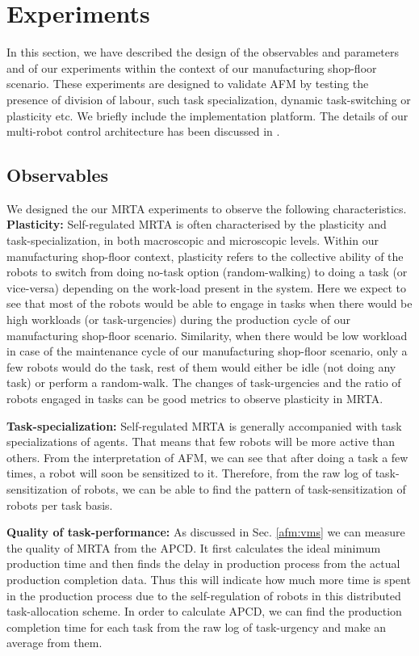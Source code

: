 \documentclass[smallcondensed]{svjour3}
\begin{document}
\section{Experiments}
\label{sec:expt}
In this section, we have described the design of the observables and parameters and  of our experiments within the context of our  manufacturing shop-floor scenario. 
These experiments are designed to validate AFM by testing the presence of division of labour, such task specialization, dynamic task-switching or plasticity etc. We briefly include the implementation platform. The details of our multi-robot control architecture has been discussed in \cite{Sarker2010control}.
\subsection{Observables}
We designed the our MRTA experiments to observe the following characteristics.
\textbf{Plasticity:} %
Self-regulated MRTA is often characterised by the plasticity and task-specialization, in both macroscopic and microscopic levels. Within our manufacturing shop-floor context, plasticity refers to the collective ability of the robots to switch from doing no-task option (random-walking) to doing a task (or vice-versa) depending on the work-load present in the system. Here we expect to see that most of the robots would be able to engage in tasks when there would be high workloads (or task-urgencies) during the production cycle of our manufacturing shop-floor scenario. Similarity, when there would be low workload in case of the maintenance cycle of our manufacturing shop-floor scenario, only a few robots would do the task, rest of them would either be idle (not doing any task) or perform a random-walk.  The changes of task-urgencies and the ratio of robots engaged in tasks can be good metrics to observe plasticity in MRTA.

\textbf{Task-specialization:} Self-regulated MRTA is generally accompanied with task specializations of agents. That means that few robots will be more active than others. From the interpretation of AFM, we can see that after doing a task a few times, a robot will soon be sensitized to it. Therefore, from the raw log of task-sensitization of robots, we can be able to find the pattern of task-sensitization of robots per task basis.

\textbf{Quality of task-performance:} As discussed in Sec. \ref{afm:vms} we can measure the quality of MRTA from the APCD. It first calculates the ideal minimum production time and then finds the delay in production process from the actual production completion data. Thus this will indicate how much more time is  spent in the production process due to the self-regulation of robots in this distributed task-allocation scheme.  In order to calculate APCD, we can find the production completion time for each task from the raw log of task-urgency and make an average from them.
\end{document}
